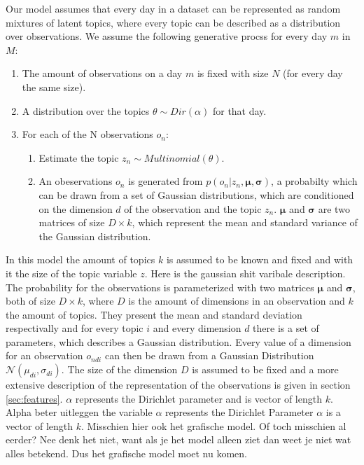 \documentclass[11pt,a4paper]{article}
\begin{document}
  Our model assumes that every day in a dataset can be represented as random mixtures of latent topics, where every topic can be described as a distribution over observations. We assume the following generative procss for every day $m$ in $M$:
\begin{enumerate}
 \item The amount of observations on a day $m$ is fixed with size $N$ (for every day the same size).
 \item A distribution over the topics $\theta \sim Dir(\alpha)$ for that day.
 \item For each of the N observations $o_n$:
 
 \begin{enumerate}
  \item Estimate the topic $z_n \sim Multinomial(\theta)$.
  \item An obeservations $o_n$ is generated from $p(o_n |z_n,\boldsymbol\mu,\boldsymbol\sigma)$, a probabilty which can be drawn from a set of Gaussian distributions, which are conditioned on the dimension $d$ of the observation and the topic $z_n$. $\boldsymbol\mu$ and $\boldsymbol\sigma$ are two matrices of size  $D\times k$, which represent the mean and standard variance of the Gaussian distribution.
 \end{enumerate}

\end{enumerate}
  
In this model the amount of topics $k$ is assumed to be known and fixed and with it the size of the topic variable $z$.
 Here is the gaussian shit varibale description.
The probability for the observations is parameterized with two matrices $\boldsymbol\mu$ and $\boldsymbol\sigma$, both of size $D\times k$, where $D$ is the amount of dimensions in an observation and $k$ the amount of topics. They present the mean and standard deviation respectivally and for every topic $i$ and every dimension $d$ there is a set of parameters, which describes a Gaussian distribution.  Every value of a dimension for an observation $o_{ndi}$ can then be drawn from a Gaussian Distribution $\mathcal{N}(\mu_{di},\sigma_{di})$.
The size of the dimension $D$ is assumed to be fixed and a more extensive description of the representation of the observations is given in section \ref{sec:features}. $\alpha$ represents the Dirichlet parameter and is vector of length $k$.
Alpha beter uitleggen
the variable $\alpha$ represents the Dirichlet Parameter
$\alpha$ is a vector of length $k$.
Misschien hier ook het grafische model. Of toch misschien al eerder? Nee denk het niet, want als je het model alleen ziet dan weet je niet wat alles betekend. Dus het grafische model moet nu komen.
\end{document}
